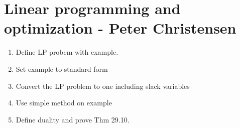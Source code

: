 \section*{Linear programming and optimization - Peter Christensen}

\begin{enumerate}
	\item Define LP probem with example.
	\item Set example to standard form
	\item Convert the LP problem to one including slack variables
	\item Use simple method on example
	\item Define duality and prove Thm 29.10.
\end{enumerate}